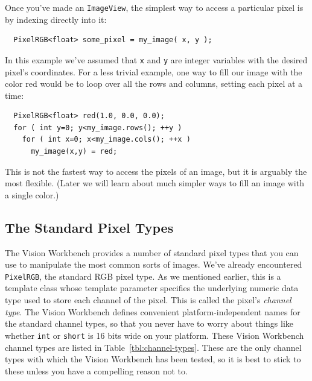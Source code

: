 Once you've made an \verb#ImageView#, the simplest way to access a 
particular pixel is by indexing directly into it:
\begin{verbatim}
  PixelRGB<float> some_pixel = my_image( x, y );
\end{verbatim}
In this example we've assumed that \verb#x# and \verb#y# are integer
variables with the desired pixel's coordinates.  For a less trivial
example, one way to fill our image with the color red would be to loop
over all the rows and columns, setting each pixel at a time:
\begin{verbatim}
  PixelRGB<float> red(1.0, 0.0, 0.0);
  for ( int y=0; y<my_image.rows(); ++y )
    for ( int x=0; x<my_image.cols(); ++x )
      my_image(x,y) = red;
\end{verbatim}
This is not the fastest way to access the pixels of an image, but 
it is arguably the most flexible.  (Later we will learn about much 
simpler ways to fill an image with a single color.)

\subsection{The Standard Pixel Types}

The Vision Workbench provides a number of standard pixel types that
you can use to manipulate the most common sorts of images.  We've
already encountered \verb#PixelRGB#, the standard RGB pixel type.  As
we mentioned earlier, this is a template class whose template
parameter specifies the underlying numeric data type used to store
each channel of the pixel.  This is called the pixel's {\it channel
type}.  The Vision Workbench defines convenient platform-independent
names for the standard channel types, so that you never have to worry
about things like whether \verb#int# or \verb#short# is 16 bits wide
on your platform.  These Vision Workbench channel types are listed in
Table~\ref{tbl:channel-types}.  These are the only channel types with
which the Vision Workbench has been tested, so it is best to stick to
these unless you have a compelling reason not to.

